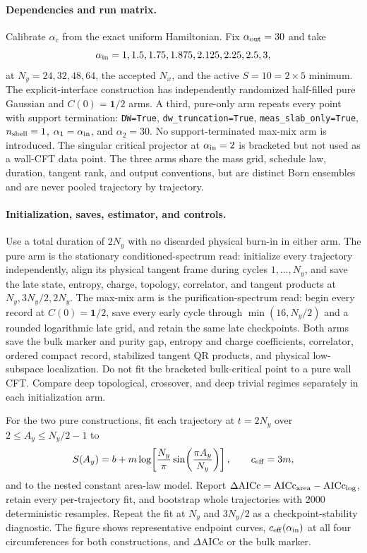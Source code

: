 \documentclass[aps,prx,twocolumn,floatfix,nofootinbib,superscriptaddress,longbibliography]{revtex4-2}
\newcommand{\code}[1]{\texttt{#1}}
\begin{document}
\paragraph*{Dependencies and run matrix.}
Calibrate $\alpha_c$ from the exact uniform Hamiltonian.  Fix
$\alpha_{\rm out}=30$ and take
\begin{equation}
 \alpha_{\rm in}=1,1.5,1.75,1.875,2.125,2.25,2.5,3,
\end{equation}
at $N_y=24,32,48,64$, the accepted $N_x$, and the active $S=10=2\times5$ minimum.
The explicit-interface construction has independently randomized half-filled pure
Gaussian and $C(0)=\mathbf{1}/2$ arms.  A third, pure-only arm repeats every point with
support termination: \code{DW=True}, \code{dw\_truncation=True},
\code{meas\_slab\_only=True}, $n_{\rm shell}=1$, $\alpha_1=\alpha_{\rm in}$, and
$\alpha_2=30$.  No support-terminated max-mix arm is introduced.  The singular critical
projector at $\alpha_{\rm in}=2$ is bracketed but not used as a wall-CFT data point.
The three arms share the mass grid, schedule law, duration, tangent rank, and output
conventions, but are distinct Born ensembles and are never pooled trajectory by trajectory.

\paragraph*{Initialization, saves, estimator, and controls.}
Use a total duration of $2N_y$ with no discarded physical burn-in in either arm.  The
pure arm is the stationary conditioned-spectrum read: initialize every trajectory
independently, align its physical tangent frame during cycles $1,\ldots,N_y$, and save the
late state, entropy, charge, topology, correlator, and tangent products at
$N_y,3N_y/2,2N_y$.  The max-mix arm is the purification-spectrum read: begin every record
at $C(0)=\mathbf{1}/2$, save every early cycle through $\min(16,N_y/2)$ and a rounded
logarithmic late grid, and retain the same late checkpoints.  Both arms save the
bulk marker and purity gap, entropy and charge coefficients, correlator, ordered compact
record, stabilized tangent QR products, and physical low-subspace localization.  Do not
fit the bracketed bulk-critical point to a pure wall CFT.  Compare deep topological,
crossover, and deep trivial regimes separately in each initialization arm.

For the two pure constructions, fit each trajectory at $t=2N_y$ over
$2\leq A_y\leq N_y/2-1$ to
\begin{equation}
 S(A_y)=b+m\log\!\left[\frac{N_y}{\pi}\sin\!\left(\frac{\pi A_y}{N_y}\right)\right],
 \qquad c_{\rm eff}=3m,
\end{equation}
and to the nested constant area-law model.  Report
$\Delta\mathrm{AICc}=\mathrm{AICc}_{\rm area}-\mathrm{AICc}_{\rm log}$, retain every
per-trajectory fit, and bootstrap whole trajectories with 2000 deterministic resamples.
Repeat the fit at $N_y$ and $3N_y/2$ as a checkpoint-stability diagnostic.  The figure
shows representative endpoint curves, $c_{\rm eff}(\alpha_{\rm in})$ at all four
circumferences for both constructions, and $\Delta\mathrm{AICc}$ or the bulk marker.
\end{document}
